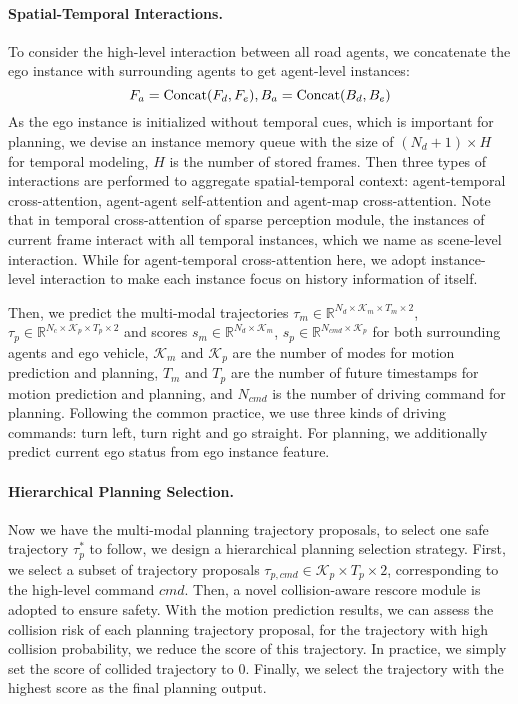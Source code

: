 \paragraph{Spatial-Temporal Interactions.}
To consider the high-level interaction between all road agents, we concatenate the ego instance with surrounding agents to get agent-level instances:
\begin{equation}
F_a={\rm Concat}(F_d, F_e), B_a={\rm Concat}(B_d, B_e)
\end{equation}
As the ego instance is initialized without temporal cues, which is important for planning, we devise an instance memory queue with the size of $(N_d+1) \times H$ for temporal modeling, $H$ is the number of stored frames. Then three types of interactions are performed to aggregate spatial-temporal context: agent-temporal cross-attention, agent-agent self-attention and agent-map cross-attention. Note that in temporal cross-attention of sparse perception module, the instances of current frame interact with all temporal instances, which we name as scene-level interaction. While for agent-temporal cross-attention here, we adopt instance-level interaction to make each instance focus on history information of itself.

Then, we predict the multi-modal trajectories $\tau_m \in \mathbb{R}^{N_{d} \times \mathcal{K}_m \times T_{m} \times 2}$, $\tau_p \in \mathbb{R}^{N_{c} \times \mathcal{K}_p \times T_{p} \times 2 }$ and scores $s_m \in \mathbb{R}^{N_{d} \times \mathcal{K}_m}$, $s_p \in \mathbb{R}^{N_{cmd} \times \mathcal{K}_p}$ for both surrounding agents and ego vehicle, $\mathcal{K}_m$ and $\mathcal{K}_p$ are the number of modes for motion prediction and planning, $T_m$ and $T_p$ are the number of future timestamps for motion prediction and planning, and $N_{cmd}$ is the number of driving command for planning. Following the common practice\cite{uniad, vad}, we use three kinds of driving commands: turn left, turn right and go straight. For planning, we additionally predict current ego status from ego instance feature.

\paragraph{Hierarchical Planning Selection.}
Now we have the multi-modal planning trajectory proposals, to select one safe trajectory $\tau_p^* $ to follow, we design a hierarchical planning selection strategy. First, we select a subset of trajectory proposals $\tau_{p,cmd} \in \mathcal{K}_p \times T_{p} \times 2$, corresponding to the high-level command $cmd$. Then, a novel collision-aware rescore module is adopted to ensure safety. With the motion prediction results, we can assess the collision risk of each planning trajectory proposal, for the trajectory with high collision probability, we reduce the score of this trajectory. In practice, we simply set the score of collided trajectory to $0$. Finally, we select the trajectory with the highest score as the final planning output.

